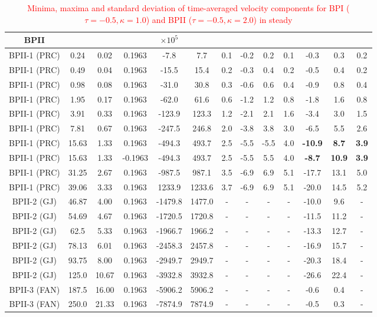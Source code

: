 \documentclass[8.5pt,twoside,twocolumn]{article}
\newcommand{\rev}[1]{{\textcolor{red}{#1}}}
\begin{document}
\begin{table}[htpb]
\begin{tabular}{|c||c|| c || c || c |c |c||c| c| c||c| c| c|}
BPII  & & & & $\times 10^5$ \\
\hline
BPII-1 (PRC) &0.24 &0.02 & 0.1963 &-7.8 &7.7 &0.1 &-0.2 &0.2 &0.1 &-0.3 &0.3 &0.2 \\
BPII-1 (PRC) &0.49 &0.04 & 0.1963 &-15.5 &15.4 &0.2 &-0.3 &0.4 &0.2 &-0.5 &0.4 &0.2 \\
BPII-1 (PRC) &0.98 &0.08 & 0.1963 &-31.0 &30.8 &0.3 &-0.6 &0.6 &0.4 &-0.9 &0.8 &0.4 \\
BPII-1 (PRC) &1.95 &0.17 & 0.1963 &-62.0 &61.6 &0.6 &-1.2 &1.2 &0.8 &-1.8 &1.6 &0.8 \\
BPII-1 (PRC) &3.91 &0.33 & 0.1963 &-123.9 &123.3 &1.2 &-2.1 &2.1 &1.6 &-3.4 &3.0 &1.5 \\
BPII-1 (PRC) &7.81 &0.67 & 0.1963 &-247.5 &246.8 &2.0 &-3.8 &3.8 &3.0 &-6.5 &5.5 &2.6 \\
BPII-1 (PRC) &15.63 &1.33 & 0.1963 &-494.3 &493.7 &2.5 &-5.5 &-5.5 &4.0 &\bf{-10.9} &\bf{8.7} &\bf{3.9} \\
BPII-1 (PRC) &15.63 &1.33 & -0.1963 &-494.3 &493.7 &2.5 &-5.5 &5.5 &4.0 &\bf{-8.7} &\bf{10.9} &\bf{3.9} \\
BPII-1 (PRC) &31.25 &2.67 & 0.1963 &-987.5 &987.1 &3.5 &-6.9 &6.9 &5.1 &-17.7 &13.1 &5.0 \\
BPII-1 (PRC) &39.06 &3.33 & 0.1963 &1233.9 &1233.6 &3.7 &-6.9 &6.9 &5.1 &-20.0 &14.5 &5.2 \\
\hline
BPII-2 (GJ) &46.87 &4.00 & 0.1963 &-1479.8 &1477.0 &- &- &- &- &-10.0 &9.6  &- \\
BPII-2 (GJ) &54.69 &4.67 & 0.1963 &-1720.5 &1720.8 &- &- &- &- &-11.5 &11.2 &- \\
BPII-2 (GJ) &62.5 &5.33 & 0.1963  &-1966.7 &1966.2 &- &- &- &- &-13.3 &12.7 &- \\
BPII-2 (GJ) &78.13 &6.01 & 0.1963 &-2458.3 &2457.8 &- &- &- &- &-16.9 &15.7 &- \\
BPII-2 (GJ) &93.75 &8.00 & 0.1963 &-2949.7 &2949.7 &- &- &- &- &-20.3 &18.4 &- \\
BPII-2 (GJ) &125.0 &10.67 &0.1963 &-3932.8 &3932.8 &- &- &- &- &-26.6 &22.4 &- \\
\hline
BPII-3 (FAN) &187.5 &16.00 & 0.1963 &-5906.2  &5906.2 &- &-  &-  &-  &-0.6 &0.4 &- \\
BPII-3 (FAN) &250.0 &21.33 & 0.1963 &-7874.9  &7874.9 &- &-  &-  &-  &-0.5 &0.3 &- \\
\hline
\end{tabular}
\caption{
\rev{Minima, maxima and standard deviation of time-averaged velocity components 
for BPI ($\tau=-0.5, \kappa=1.0$) and BPII ($\tau=-0.5, \kappa=2.0$) in steady 
}}
\end{table}
\end{document}
